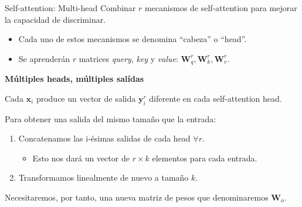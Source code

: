 \documentclass[aspectratio=169]{beamer}
\newenvironment{blockm}[1]{%
  \begin{block}{\textbf{#1}}%
  }{%
  \end{block}%
  \vspace{1em}%
}
\begin{document}
\begin{frame}{Self-attention: Multi-head}
  Combinar $r$ mecanismos de self-attention para mejorar la capacidad de discriminar.
  \begin{itemize}
    \item Cada uno de estos mecanismos se denomina ``cabeza'' o ``head''.
    \item Se aprenderán $r$ matrices \emph{query}, \emph{key} y \emph{value}: $\mathbf{W}_{q}^{r}, \mathbf{W}_{k}^{r}, \mathbf{W}_{v}^{r}$.
  \end{itemize}

  \begin{blockm}{Múltiples heads, múltiples salídas}
    Cada $\mathbf{x}_{i}$ produce un vector de salida $\mathbf{y}^{r}_{i}$ diferente en cada self-attention head.
  \end{blockm}
  Para obtener una salida del mismo tamaño que la entrada:
  \begin{enumerate}
    \item Concatenamos las i-ésimas salidas de cada head $\forall r$.
     \begin{itemize}
      \item Esto nos dará un vector de $r \times k$ elementos para cada entrada.
    \end{itemize}
    \item Transformamos linealmente de nuevo a tamaño $k$.
  \end{enumerate}
  \vspace{.1cm}

  \begin{block}{}
    \centering
    Necesitaremos, por tanto, una nueva matriz de pesos que denominaremos $\mathbf{W}_{o}$.
  \end{block}

\end{frame}

\end{document}
